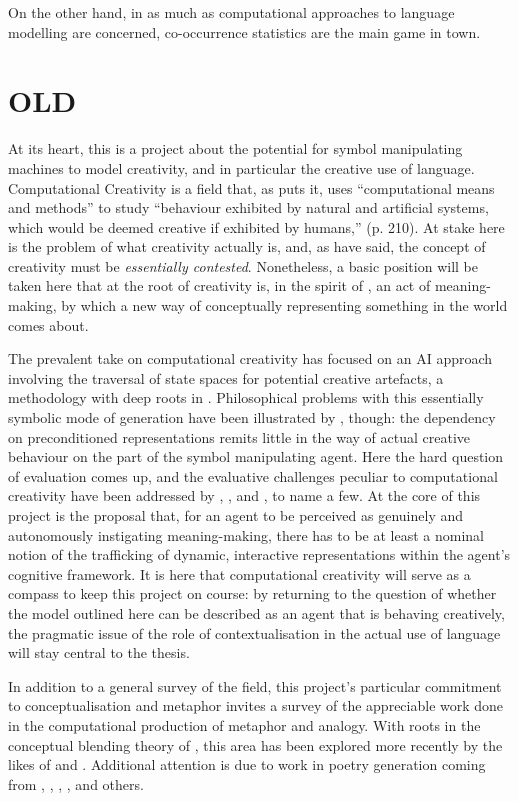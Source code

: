 On the other hand, in as much as computational approaches to language modelling are concerned, co-occurrence statistics are the main game in town.

\section{OLD}
At its heart, this is a project about the potential for symbol manipulating machines to model creativity, and in particular the creative use of language.  Computational Creativity is a field that, as \cite{Wiggins2006b} puts it, uses ``computational means and methods'' to study ``behaviour exhibited by natural and artificial systems, which would be deemed creative if exhibited by humans,'' (p. 210).  At stake here is the problem of what creativity actually is, and, as \cite{Colton} have said, the concept of creativity must be \emph{essentially contested}.  Nonetheless, a basic position will be taken here that at the root of creativity is, in the spirit of \cite{Wittgenstein1953}, an act of meaning-making, by which a new way of conceptually representing something in the world comes about.

The prevalent take on computational creativity has focused on an AI approach involving the traversal of state spaces for potential creative artefacts, a methodology with deep roots in \cite{Boden1990}.  Philosophical problems with this essentially symbolic mode of generation have been illustrated by \cite{McGregorEA2014}, though: the dependency on preconditioned representations remits little in the way of actual creative behaviour on the part of the symbol manipulating agent.  Here the hard question of evaluation comes up, and the evaluative challenges peculiar to computational creativity have been addressed by \cite{Ritchie2007}, \cite{ColtonEA2012B}, and \cite{Jordanous2012}, to name a few.  At the core of this project is the proposal that, for an agent to be perceived as genuinely and autonomously instigating meaning-making, there has to be at least a nominal notion of the trafficking of dynamic, interactive representations within the agent's cognitive framework.  It is here that computational creativity will serve as a compass to keep this project on course: by returning to the question of whether the model outlined here can be described as an agent that is behaving creatively, the pragmatic issue of the role of contextualisation in the actual use of language will stay central to the thesis.

In addition to a general survey of the field, this project's particular commitment to conceptualisation and metaphor invites a survey of the appreciable work done in the computational production of metaphor and analogy.  With roots in the conceptual blending theory of \cite{Turner}, this area has been explored more recently by the likes of \cite{VealeEA2007} and \cite{O'Donoghue}.  Additional attention is due to work in poetry generation coming from \cite{Gervas}, \cite{Toivonen}, \cite{Rashel}, \cite{Cardosa}, and others.

